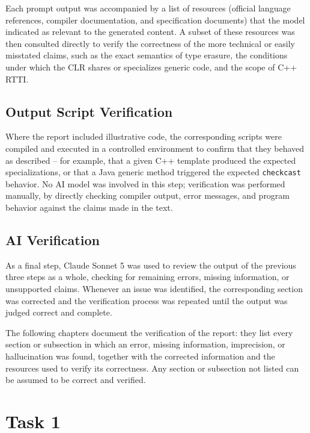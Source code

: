 \documentclass[11pt]{report}
\begin{document}
Each prompt output was accompanied by a list of resources (official
language references, compiler documentation, and specification documents)
that the model indicated as relevant to the generated content. A subset of
these resources was then consulted directly to verify the correctness of
the more technical or easily misstated claims, such as the exact semantics
of type erasure, the conditions under which the CLR shares or specializes
generic code, and the scope of C++ RTTI.

\section{Output Script Verification}
\label{VerificationProcess:OutputScriptVerification}

Where the report included illustrative code, the corresponding scripts were
compiled and executed in a controlled environment to confirm that they
behaved as described -- for example, that a given C++ template produced the
expected specializations, or that a Java generic method triggered the
expected \texttt{checkcast} behavior. No AI model was involved in this step;
verification was performed manually, by directly checking compiler output,
error messages, and program behavior against the claims made in the text.

\section{AI Verification}
\label{VerificationProcess:AIVerification}

As a final step, Claude Sonnet 5 was used to review the output of the
previous three steps as a whole, checking for remaining errors, missing
information, or unsupported claims. Whenever an issue was identified, the
corresponding section was corrected and the verification process was
repeated until the output was judged correct and complete.

\vspace{0.5cm}
\noindent The following chapters document the verification of the report:
they list every section or subsection in which an error, missing
information, imprecision, or hallucination was found, together with the
corrected information and the resources used to verify its correctness.
Any section or subsection not listed can be assumed to be correct and
verified.


\chapter{Task 1}
\end{document}
